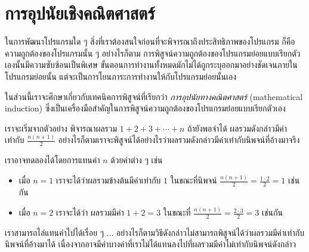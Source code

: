 \chapter{การ{\wbr}อุปนัย{\wbr}เชิง{\wbr}คณิตศาสตร์}

ใน{\wbr}การ{\wbr}พัฒนา{\wbr}โปรแกรม{\wbr}ใด ๆ สิ่ง{\wbr}ที่{\wbr}เรา{\wbr}ต้อง{\wbr}สนใจ{\wbr}ก่อน{\wbr}ที่{\wbr}จะ{\wbr}พิจารณา{\wbr}ถึง{\wbr}ประสิทธิภาพ{\wbr}ของ{\wbr}โปรแกรม{\wbr}
ก็{\wbr}คือ{\wbr}ความ{\wbr}ถูกต้อง{\wbr}ของ{\wbr}โปรแกรม{\wbr}นั้น ๆ อย่างไรก็ตาม{\wbr}
การ{\wbr}พิสูจน์{\wbr}ความ{\wbr}ถูกต้อง{\wbr}ของ{\wbr}โปรแกรมย่อย{\wbr}แบบ{\wbr}เรียก{\wbr}ตัวเอง{\wbr}นั้น{\wbr}มี{\wbr}ความ{\wbr}ซับซ้อน{\wbr}เป็นพิเศษ{\wbr}
ขั้นตอน{\wbr}การ{\wbr}ทำงาน{\wbr}ทั้งหมด{\wbr}มัก{\wbr}ไม่{\wbr}ได้{\wbr}ถูก{\wbr}ระบุ{\wbr}ออก{\wbr}มา{\wbr}อย่าง{\wbr}ชัดเจน{\wbr}ภายใน{\wbr}โปรแกรมย่อย{\wbr}นั้น{\wbr}
แต่{\wbr}จะ{\wbr}เป็น{\wbr}การ{\wbr}โยน{\wbr}ภาระ{\wbr}การ{\wbr}ทำงาน{\wbr}ให้{\wbr}กับ{\wbr}โปรแกรมย่อย{\wbr}นั้น{\wbr}เอง{\wbr}

ใน{\wbr}ส่วน{\wbr}นี้{\wbr}เรา{\wbr}จะ{\wbr}ศึกษา{\wbr}เกี่ยวกับ{\wbr}เทคนิค{\wbr}การ{\wbr}พิสูจน์{\wbr}ที่{\wbr}เรียก{\wbr}ว่า {\em การ{\wbr}อุปนัย{\wbr}ทาง{\wbr}คณิตศาสตร์}
(mathematical induction)
ซึ่ง{\wbr}เป็น{\wbr}เครื่องมือ{\wbr}สำคัญ{\wbr}ใน{\wbr}การ{\wbr}พิสูจน์{\wbr}ความ{\wbr}ถูกต้อง{\wbr}ของ{\wbr}โปรแกรมย่อย{\wbr}แบบ{\wbr}เรียก{\wbr}ตัวเอง{\wbr}

เรา{\wbr}จะ{\wbr}เริ่ม{\wbr}จาก{\wbr}ตัวอย่าง พิจารณา{\wbr}ผลรวม $1+2+3+\cdots+n$ ถ้า{\wbr}ยัง{\wbr}พอ{\wbr}จำ{\wbr}ได้{\wbr}
ผลรวม{\wbr}ดังกล่าว{\wbr}มี{\wbr}ค่า{\wbr}เท่า{\wbr}กับ $\frac{n(n+1)}{2}$
อย่างไรก็ตาม{\wbr}เรา{\wbr}จะ{\wbr}พิสูจน์{\wbr}ได้{\wbr}อย่างไร{\wbr}ว่า{\wbr}ผลรวม{\wbr}ดังกล่าว{\wbr}มี{\wbr}ค่า{\wbr}เท่า{\wbr}กับ{\wbr}นิพจน์{\wbr}ที่{\wbr}อ้าง{\wbr}มา{\wbr}จริง{\wbr}

เรา{\wbr}อาจ{\wbr}ทดลอง{\wbr}ได้{\wbr}โดย{\wbr}การ{\wbr}แทน{\wbr}ค่า $ n $ ด้วย{\wbr}ค่า{\wbr}ต่าง ๆ เช่น{\wbr}

\begin{itemize}
\item เมื่อ $ n=1 $ เรา{\wbr}จะ{\wbr}ได้{\wbr}ว่า{\wbr}ผลรวม{\wbr}ข้างต้น{\wbr}มี{\wbr}ค่า{\wbr}เท่า{\wbr}กับ $ 1 $ ใน{\wbr}ขณะที่{\wbr}นิพจน์ $
  \frac{n(n+1)}{2}=\frac{1\cdot 2}{2}=1 $ เช่นกัน{\wbr}
\item เมื่อ $ n=2 $ เรา{\wbr}จะ{\wbr}ได้{\wbr}ว่า ผลรวม{\wbr}มี{\wbr}ค่า $ 1+2=3 $ ใน{\wbr}ขณะที่ $
  \frac{n(n+1)}{2}=\frac{2\cdot 3}{2}=3 $ เช่นกัน{\wbr}
\end{itemize}

เรา{\wbr}สามารถ{\wbr}ไล่{\wbr}แทน{\wbr}ค่า{\wbr}ไป{\wbr}ได้{\wbr}เรื่อย ๆ
... อย่างไรก็ตาม{\wbr}วิธี{\wbr}ดังกล่าว{\wbr}ไม่{\wbr}สามารถ{\wbr}พิสูจน์{\wbr}ได้{\wbr}ว่า{\wbr}ผลรวม{\wbr}มี{\wbr}ค่า{\wbr}เท่า{\wbr}กับ{\wbr}นิพจน์{\wbr}ที่{\wbr}อ้าง{\wbr}มา{\wbr}ได้{\wbr}
เนื่องจาก{\wbr}อาจ{\wbr}มี{\wbr}ค่า{\wbr}บาง{\wbr}ค่า{\wbr}ที่{\wbr}เรา{\wbr}ไม่{\wbr}ได้{\wbr}แทน{\wbr}ลง{\wbr}ไป{\wbr}ที่{\wbr}ผลรวม{\wbr}มี{\wbr}ค่า{\wbr}ไม่{\wbr}เท่า{\wbr}กับ{\wbr}นิพจน์{\wbr}ดังกล่าว{\wbr}

